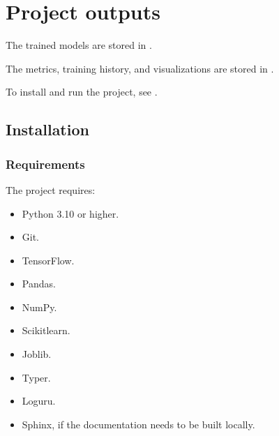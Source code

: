 \documentclass[letterpaper,10pt,english]{sphinxmanual}
\begin{document}
\chapter{Project outputs}
\label{\detokenize{index:project-outputs}}
\sphinxAtStartPar
The trained models are stored in .

\sphinxAtStartPar
The metrics, training history, and visualizations are stored in .

\sphinxAtStartPar
To install and run the project, see {\hyperref[\detokenize{installation::doc}]{}}.

\sphinxstepscope


\section{Installation}
\label{\detokenize{installation:installation}}\label{\detokenize{installation::doc}}

\subsection{Requirements}
\label{\detokenize{installation:requirements}}
\sphinxAtStartPar
The project requires:
\begin{itemize}
\item {} 
\sphinxAtStartPar
Python 3.10 or higher.

\item {} 
\sphinxAtStartPar
Git.

\item {} 
\sphinxAtStartPar
TensorFlow.

\item {} 
\sphinxAtStartPar
Pandas.

\item {} 
\sphinxAtStartPar
NumPy.

\item {} 
\sphinxAtStartPar
Scikit\sphinxhyphen{}learn.

\item {} 
\sphinxAtStartPar
Joblib.

\item {} 
\sphinxAtStartPar
Typer.

\item {} 
\sphinxAtStartPar
Loguru.

\item {} 
\sphinxAtStartPar
Sphinx, if the documentation needs to be built locally.

\end{itemize}
\end{document}

